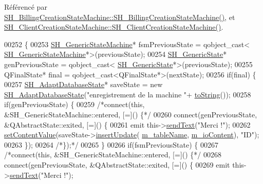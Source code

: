 Référencé par \hyperlink{classSH__BillingCreationStateMachine_ad62b77fa4aeafe200056ff3974562f83}{S\-H\-\_\-\-Billing\-Creation\-State\-Machine\-::\-S\-H\-\_\-\-Billing\-Creation\-State\-Machine()}, et \hyperlink{classSH__ClientCreationStateMachine_a0b406b0f404c0fd33bf35be8ce0cc811}{S\-H\-\_\-\-Client\-Creation\-State\-Machine\-::\-S\-H\-\_\-\-Client\-Creation\-State\-Machine()}.


\begin{DoxyCode}
00252 \{
00253     \hyperlink{classSH__GenericStateMachine}{SH\_GenericStateMachine}* fsmPreviousState = qobject\_cast<
      \hyperlink{classSH__GenericStateMachine}{SH\_GenericStateMachine}*>(previousState);
00254     \hyperlink{classSH__GenericState}{SH\_GenericState}* genPreviousState = qobject\_cast<
      \hyperlink{classSH__GenericState}{SH\_GenericState}*>(previousState);
00255     QFinalState* \textcolor{keyword}{final} = qobject\_cast<QFinalState*>(nextState);
00256     \textcolor{keywordflow}{if}(\textcolor{keyword}{final}) \{
00257         \hyperlink{classSH__AdaptDatabaseState}{SH\_AdaptDatabaseState}* saveState = \textcolor{keyword}{new} 
      \hyperlink{classSH__AdaptDatabaseState}{SH\_AdaptDatabaseState}(\textcolor{stringliteral}{"enregistrement de la machine "}+
      \hyperlink{classSH__GenericStateMachine_a85c0c1c9d258ae991f84667412fa47cd}{toString}());
00258         \textcolor{keywordflow}{if}(genPreviousState) \{
00259             \textcolor{comment}{/*connect(this, &SH\_GenericStateMachine::entered, [=]() \{*/}
00260             connect(genPreviousState, &QAbstractState::exited, [=]() \{
00261                 emit this->\hyperlink{classSH__InOutStateMachine_a5e7f5958bae31696b6a8deab94ad2b4f}{sendText}(\textcolor{stringliteral}{"Merci !"});
00262                 \hyperlink{classSH__InOutStateMachine_a9ab1534306b2bdb62743d4bcefe40c17}{setContentValue}(saveState->\hyperlink{classSH__AdaptDatabaseState_a037db544ea05f42d21fcbdda758839fe}{insertUpdate}(
      \hyperlink{classSH__InOutStateMachine_aa009eecc5ab6181358faafb5996b6006}{m\_tableName}, \hyperlink{classSH__InOutStateMachine_a8cfbc27eef057bf37b7711bdfef2077e}{m\_ioContent}), \textcolor{stringliteral}{"ID"});
00263             \});
00264             \textcolor{comment}{/*\});*/}
00265         \}
00266         \textcolor{keywordflow}{if}(fsmPreviousState) \{
00267             \textcolor{comment}{/*connect(this, &SH\_GenericStateMachine::entered, [=]() \{*/}
00268             connect(genPreviousState, &QAbstractState::exited, [=]() \{
00269                 emit this->\hyperlink{classSH__InOutStateMachine_a5e7f5958bae31696b6a8deab94ad2b4f}{sendText}(\textcolor{stringliteral}{"Merci !"});

\end{DoxyCode}
